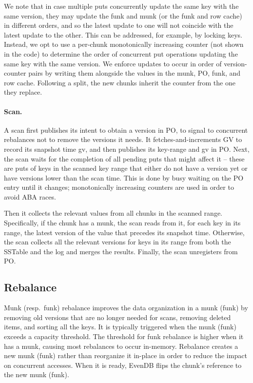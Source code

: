 \documentclass[sigplan,10pt]{acmart}
\newcommand{\code}[1]{\textsf{\fontsize{9}{11}\selectfont #1}}
\newcommand{\sys}{EvenDB}
\begin{document}
We note that in case multiple puts concurrently update the same key with the same version, they
may update the funk and munk (or the funk and row cache) in  different orders,
and so the latest update to one will not coincide with the latest update to the other. 
This can be addressed, for example, by locking keys. 
Instead, we opt to use a per-chunk monotonically increasing counter (not shown in the code) to determine 
the order of concurrent put operations updating the same key with the same version. %
We  enforce updates to occur in order of version-counter pairs by writing them alongside the values in the munk, 
PO, funk, and row cache.
Following a split, the new chunks inherit the counter from the one they replace.  


\paragraph{Scan.}
A scan first publishes its intent to obtain a version in PO, to 
signal to concurrent rebalances not to remove the versions it needs. It
fetches-and-increments GV to record its snapshot time \code{gv},  
and then publishes its key-range and \code{gv} in PO.
Next, the scan waits for the completion of all pending puts  
that might affect it  -- these are puts of keys in the scanned key range that either do not have a version yet or have versions lower than the scan time.
This is done by busy waiting on the PO entry until it changes; monotonically increasing counters are used 
in order to avoid ABA races. 

Then it collects the relevant values from all chunks in the scanned range.
Specifically, if the chunk has a munk, the scan reads from it, for each key in its range, 
the latest version of the value that precedes its snapshot time.
Otherwise, the scan collects all the relevant versions for keys in its range from both 
the {SSTable}   and the {log} and merges the results.
Finally, the scan unregisters from PO.

\subsection{Rebalance}
\label{ssec:rebalance}

Munk (resp.\ funk) rebalance improves the data organization in a munk (funk) by removing old versions that are no longer needed 
for scans, removing deleted items, and sorting all the keys. It is typically triggered when the munk (funk) exceeds a capacity threshold.   
The threshold for funk rebalance is higher when it has a munk, causing most rebalances to occur in-memory.
Rebalance creates  a new munk (funk) rather than reorganize it in-place 
in order to reduce the impact on concurrent accesses. When it is ready, \sys\/ flips the 
chunk's reference to the new munk (funk).
\end{document}
